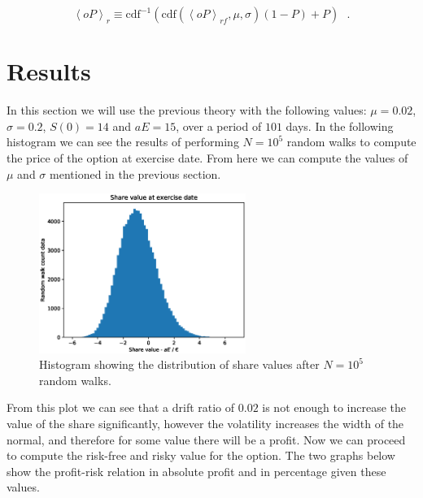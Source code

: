 \documentclass[8 pt]{article}
\newcommand{\avg}[1]{\left\langle #1 \right\rangle}
\begin{document}
\begin{equation}
  \avg{oP}_r \equiv \text{cdf}^{-1} \left( \text{cdf}(\avg{oP}_{rf}, \mu, \sigma)(1 - P) + P \right) ~~~ .
\end{equation}

\section{Results}

In this section we will use the previous theory with the following values: $\mu = 0.02$, $\sigma = 0.2$, $S(0) = 14$ and $aE = 15$, over a period of $101$ days. In the following histogram we can see the results of performing $N=10^5$ random walks to compute the price of the option at exercise date. From here we can compute the values of $\mu$ and $\sigma$ mentioned in the previous section.

\begin{figure}[H]
  \begin{center}
    \includegraphics[width=0.6\textwidth]{graphs/rw-hist.eps}
    \caption{Histogram showing the distribution of share values after $N=10^5$ random walks.}
    \label{fig:rw_hist}
  \end{center}
\end{figure}

From this plot we can see that a drift ratio of $0.02$ is not enough to increase the value of the share significantly, however the volatility increases the width of the normal, and therefore for some value there will be a profit. Now we can proceed to compute the risk-free and risky value for the option. The two graphs below show the profit-risk relation in absolute profit and in percentage given these values.
\end{document}
